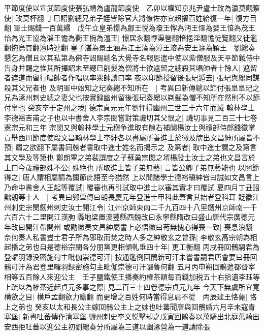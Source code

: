 平節度使以宣武節度使張弘靖為盧龍節度使　乙卯以權知京兆尹盧士玫為瀛莫觀察使|{
	玫莫杯翻}
丁巳詔劉總兄弟子姪皆除官大將僚佐亦宜超擢百姓給復一年|{
	復方目翻}
軍士賜錢一百萬緡　戊午立皇弟憬為鄜王悦為瓊王惸為沔王懌為婺王愔為茂王怡為光王協為淄王憺為衢王惋為澶王|{
	憬居永翻惸渠營翻愔挹淫翻憺徒覽翻又徒濫翻惋烏貫翻澶時連翻}
皇子湛為景王涵為江王湊為漳王溶為安王瀍為穎王　劉總奏懇乞為僧且以其私第為佛寺詔賜總名大覺寺名報恩遣中使以紫僧服及天平節鉞侍中告身并賜之惟其所擇詔未至總已削髮為僧將士欲遮留之總殺其唱帥者十餘人|{
	遮留者遮道而留行唱帥者作唱以率衆帥讀曰率}
夜以印節授留後張玘遁去|{
	張玘與總同謀殺其父兄者也}
及明軍中始知之玘奏總不知所在　|{
	考異曰新傳總以節付張臯臯玘之兄為涿州刺史總之妻父也按實録幽州留後張玘奏總以剃髮為僧不知所在然則不以節付臯也}
癸亥卒于定州之境|{
	德宗貞元元年劉怦得幽州三世三十六年而滅}
翰林學士李德裕吉甫之子也以中書舍人李宗閔嘗對策譏切其父恨之|{
	譏切事見二百三十七卷憲宗元和三年}
宗閔又與翰林學士元稹争進取有隙右補闕楊汝士與禮部侍郎錢徽掌貢舉西川節度使段文昌翰林學士李紳各以書屬所善進士於徽及牓出文昌紳所屬皆不預|{
	屬之欲翻下屬書同牓者書取中進士姓名而揭示之}
及第者|{
	取中進士謂之及第言其文學及等第也}
鄭朗覃之弟裴譔度之子蘇巢宗閔之壻楊殷士汝士之弟也文昌言於上曰今歲禮部殊不公|{
	殊絶也}
所取進士皆子弟無藝|{
	言皆公卿子弟無藝能也}
以關節得之|{
	唐人謂相屬請為關節此語至今猶然}
上以問諸學士德裕稹紳皆曰誠如文昌言上乃命中書舍人王起等覆試|{
	覆審也再引試取中進士以審其實才曰覆試}
夏四月丁丑詔黜朗等十人　|{
	考異曰鄭覃傳曰朗長慶元年登進士甲科此蓋言其始者登科耳}
貶徽江州刺史宗閔劒州刺史汝士開江令|{
	江州京師東南二千九百四十八里劒州京師南一千六百六十二里開江漢朐縣地梁置漢豐縣西魏改曰永寧縣隋改曰盛山唐代宗廣德元年改曰開江帶開州}
或勸徽奏文昌紳屬書上必悟徽曰苟無愧心得喪一致|{
	喪息浪翻}
奈何奏人私書豈士君子所為邪取而焚之時人多之紳敬玄之曾孫|{
	李敬玄高宗朝為相}
起播之弟也自是德裕宗閔各分朋黨更相傾軋垂四十年|{
	更工衡翻}
丙戌冊回鶻嗣君為登囉羽録没密施句主毗伽崇德可汗|{
	按通鑑例回鶻新可汗未嘗書嗣君唐會要曰冊回鶻可汗為君登里囉羽録密施勾主毗伽崇德可汗囉魯何翻}
五月丙申朔回鶻遣都督宰相等五百餘人來迎公主　壬子鹽鐵使王播奏約榷茶額每百錢加税五十右拾遺李珏等上疏以為榷茶近起貞元多事之際|{
	見二百三十四卷德宗貞元九年}
今天下無虞所宜寛横歛之目|{
	横戶孟翻歛力贍翻}
而更增之百姓何時當得息肩不從　丙辰建王恪薨|{
	恪上之弟也}
癸亥以太和長公主嫁回鶻公主上之妹也吐蕃聞唐與回鶻婚六月辛未寇青塞堡|{
	新書吐蕃傳作清塞堡}
鹽州刺史李文悦擊却之戊寅回鶻奏以萬騎出北庭萬騎出安西拒吐蕃以迎公主初劉總奏分所屬為三道以幽涿營為一道請除張

